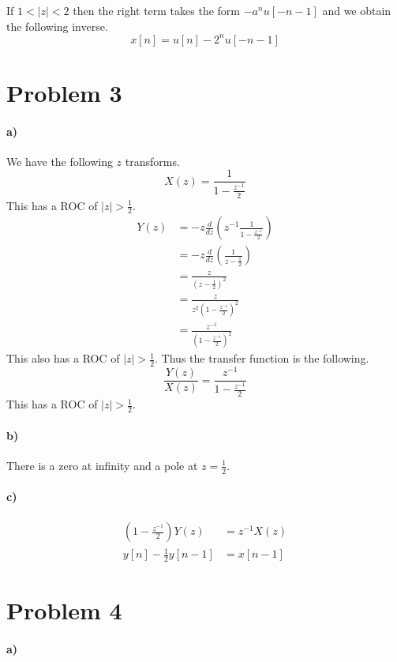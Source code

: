 \documentclass[12pt]{article}
\begin{document}
If \(1<|z|<2\) then the right term takes the form \(-a^nu[-n-1]\) and we obtain the following inverse.
\[x[n]=u[n] - 2^nu[-n-1]\]

\section*{Problem 3}

\paragraph{a)}

We have the following \(z\) transforms.
\[X(z) = \frac{1}{1-\frac{z^{-1}}{2}}\]
This has a ROC of \(|z|>\frac{1}{2}\).
\begin{align*}
    Y(z)&= -z\frac{d}{dz}\left(z^{-1}\frac{1}{1-\frac{z^{-1}}{2}}\right)\\
    &= -z\frac{d}{dz}\left(\frac{1}{z-\frac{1}{2}}\right)\\
    &= \frac{z}{\left(z-\frac{1}{2}\right)^2}\\
    &= \frac{z}{z^2\left(1-\frac{z^{-1}}{2}\right)^2}\\
    &= \frac{z^{-1}}{\left(1-\frac{z^{-1}}{2}\right)^2}
\end{align*}
This also has a ROC of \(|z|>\frac{1}{2}\). Thus the transfer function is the following.
\[\frac{Y(z)}{X(z)}=\frac{z^{-1}}{1-\frac{z^{-1}}{2}}\]
This has a ROC of \(|z|>\frac{1}{2}\).

\paragraph{b)}

There is a zero at infinity and a pole at \(z=\frac{1}{2}\).

\paragraph{c)}

\begin{align*}
    \left(1-\frac{z^{-1}}{2}\right)Y(z) &= z^{-1}X(z)\\
    y[n] - \frac{1}{2} y[n-1] &= x[n-1]
\end{align*}

\section*{Problem 4}

\paragraph{a)}
\end{document}
